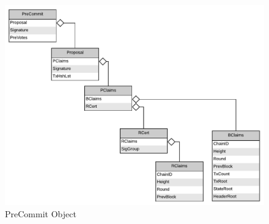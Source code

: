 \begin{figure}[H]
    \centering
    \includegraphics[scale=0.5]{figures/PreCommit_Object.pdf}
    \caption{PreCommit Object}
\end{figure}
